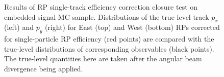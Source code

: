 \begin{figure}[h]
{\begin{subfigure}[b]{\linewidth}
  \end{subfigure}
}%
\caption[Results of RP single-track efficiency correction closure test on embedded signal MC sample.]{Results of RP single-track efficiency correction closure test on embedded signal MC sample. Distributions of the true-level track $p_{x}$ (left) and $p_{y}$ (right) for East (top) and West (bottom) RPs corrected for single-particle RP efficiency (red points) are compared with the true-level distributions of corresponding observables (black points). The true-level quantities here are taken after the angular beam divergence being applied.}\label{fig:closureTestTpcTofSingleTrk}%
\end{figure}

\begin{figure}[h]
\centering
\parbox{0.4725\textwidth}{
  \centering
  \begin{subfigure}[b]{\linewidth}
                \\
  \end{subfigure}\\ 
  \begin{subfigure}[b]{\linewidth}\addtocounter{subfigure}{1}

\end{subfigure}}
\end{figure}
